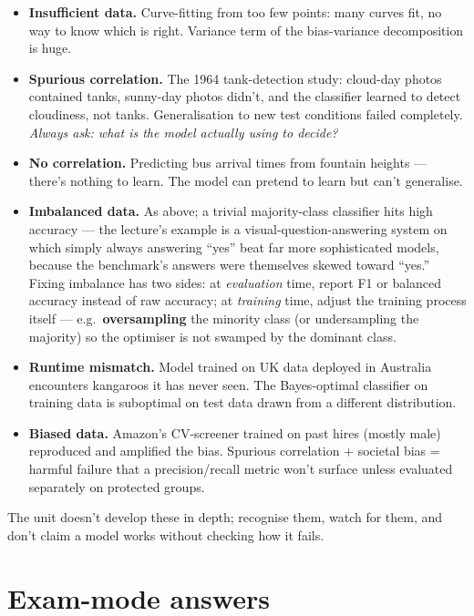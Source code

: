 \documentclass[11pt, a4paper]{article}
\begin{document}
\begin{itemize}
  \item \textbf{Insufficient data.} Curve-fitting from too few points: many curves fit, no way to know which is right. Variance term of the bias-variance decomposition is huge.
  \item \textbf{Spurious correlation.} The 1964 tank-detection study: cloud-day photos contained tanks, sunny-day photos didn't, and the classifier learned to detect cloudiness, not tanks. Generalisation to new test conditions failed completely. \emph{Always ask: what is the model actually using to decide?}
  \item \textbf{No correlation.} Predicting bus arrival times from fountain heights — there's nothing to learn. The model can pretend to learn but can't generalise.
  \item \textbf{Imbalanced data.} As above; a trivial majority-class classifier hits high accuracy — the lecture's example is a visual-question-answering system on which simply always answering ``yes'' beat far more sophisticated models, because the benchmark's answers were themselves skewed toward ``yes.'' Fixing imbalance has two sides: at \emph{evaluation} time, report F1 or balanced accuracy instead of raw accuracy; at \emph{training} time, adjust the training process itself — e.g.\ \textbf{oversampling} the minority class (or undersampling the majority) so the optimiser is not swamped by the dominant class.
  \item \textbf{Runtime mismatch.} Model trained on UK data deployed in Australia encounters kangaroos it has never seen. The Bayes-optimal classifier on training data is suboptimal on test data drawn from a different distribution.
  \item \textbf{Biased data.} Amazon's CV-screener trained on past hires (mostly male) reproduced and amplified the bias. Spurious correlation + societal bias = harmful failure that a precision/recall metric won't surface unless evaluated separately on protected groups.
\end{itemize}

The unit doesn't develop these in depth; recognise them, watch for them, and don't claim a model works without checking how it fails.

\section*{Exam-mode answers}
\end{document}
